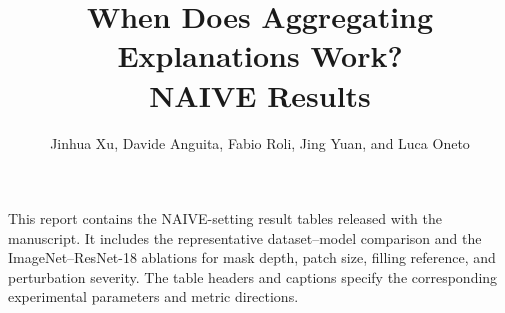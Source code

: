 \documentclass[10pt]{article}
\title{When Does Aggregating Explanations Work?\\NAIVE Results}
\author{Jinhua Xu, Davide Anguita, Fabio Roli, Jing Yuan, and Luca Oneto}
\date{}
\begin{document}
\maketitle

\noindent
This report contains the NAIVE-setting result tables released with the
manuscript. It includes the representative dataset--model comparison and the
ImageNet--ResNet-18 ablations for mask depth, patch size, filling reference,
and perturbation severity. The table headers and captions specify the
corresponding experimental parameters and metric directions.


\end{document}
